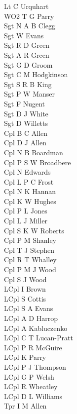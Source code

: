 \begin{multicols}{3}
  \small
  \noindent
  Lt C Urquhart \\
  WO2 T G Parry \\
  Sgt N A B Clegg \\
  Sgt W Evans \\
  Sgt R D Green \\
  Sgt A R Green \\
  Sgt G D Groom \\
  Sgt C M Hodgkinson \\
  Sgt S R B King \\
  Sgt P W Manser \\
  Sgt F Nugent \\
  Sgt D J White \\
  Sgt D Willetts \\
  Cpl B C Allen \\
  Cpl D J Allen \\
  Cpl N B Boardman \\
  Cpl P S W Broadbere \\
  Cpl N Edwards \\
  Cpl L P C Frost \\
  Cpl N K Hannan \\
  Cpl K W Hughes \\
  Cpl P L Jones \\
  Cpl L J Miller \\
  Cpl S K W Roberts \\
  Cpl P M Shanley \\
  Cpl T J Stephen \\
  Cpl R T Whalley \\
  Cpl P M J Wood \\
  Cpl S J Wood \\
  LCpl I Brown \\
  LCpl S Cottis \\
  LCpl S A Evans \\
  LCpl A D Harrop \\
  LCpl A Kabluczenko \\
  LCpl C T Lucan-Pratt \\
  LCpl P R McGuire \\
  LCpl K Parry \\
  LCpl P J Thompson \\
  LCpl G P Welsh \\
  LCpl R Wheatley \\
  LCpl D L Williams \\
  Tpr I M Allen \\

\end{multicols}
